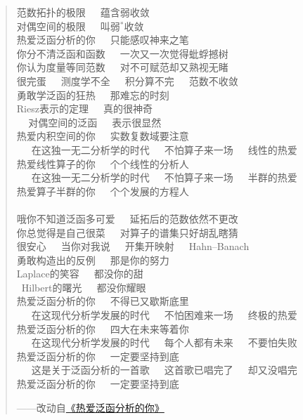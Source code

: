 \begin{quotation}
    \begin{center}范数拓扑的极限\ \ \ 蕴含弱收敛\\
        对偶空间的极限\ \ \ 叫弱$^*$收敛\\
        热爱泛函分析的你\ \ \ 只能感叹神来之笔\\
        你分不清泛函和函数\ \ \ 一次又一次觉得蚍蜉撼树\\
        你认为度量等同范数\ \ \ 对不可赋范却又熟视无睹\\
        很完蛋\ \ \ 测度学不全\ \ \ 积分算不完\ \ \ 范数不收敛\\
        勇敢学泛函的狂热\ \ \ 那难忘的时刻\qquad\\
        Riesz表示的定理\ \ \ 真的很神奇\qquad\ \ \ \\
        \ \ \,对偶空间的泛函\ \ \ 表示很显然\qquad\ \ \ \\
        热爱内积空间的你\ \ \ 实数复数域要注意\\
        \ \ \ 在这独一无二分析学的时代\ \ \ 不怕算子来一场\ \ \ 线性的热爱\\
        热爱线性算子的你\ \ \ 个个线性的分析人\\
        \ \ \ 在这独一无二分析学的时代\ \ \ 不怕算子来一场\ \ \ 半群的热爱\\
        热爱算子半群的你\ \ \ 个个发展的方程人\\
        \\
        哦你不知道泛函多可爱\ \ \ 延拓后的范数依然不更改\\
        你总觉得是自己很菜\ \ \ 对算子的谱集只好胡乱瞎猜\\
        很安心\ \ \ 当你对我说\ \ \ 开集开映射\ \ \ Hahn--Banach\\
        勇敢构造出的反例\ \ \ 那是你的努力\qquad\\
        Laplace的笑容\ \ \ 都没你的甜\qquad\\
        \ Hilbert的曙光\ \ \ 都没你耀眼\qquad\\
        热爱泛函分析的你\ \ \ 不得已又歇斯底里\\
        \ \ \ 在这现代分析学发展的时代\ \ \ 不怕困难来一场\ \ \ 终极的热爱\\
        热爱泛函分析的你\ \ \ 四大在未来等着你\\
        \ \ \ 在这现代分析学发展的时代\ \ \ 每个人都有未来\ \ \ 不要怕失败\\
        热爱泛函分析的你\ \ \ 一定要坚持到底\quad\\
        \ \ \ 这是关于泛函分析的一首歌\ \ \ 这首歌已唱完了\ \ \ 却又没唱完\\
        热爱泛函分析的你\ \ \ 一定要坚持到底\quad
    \end{center}
    \begin{flushright}
    ——改动自\href{https://www.bilibili.com/video/BV1M44y1477f/?spm_id_from=333.337.search-card.all.click}
    {\textcolor{666666}{《热爱泛函分析的你》}}
    \end{flushright}
\end{quotation}

